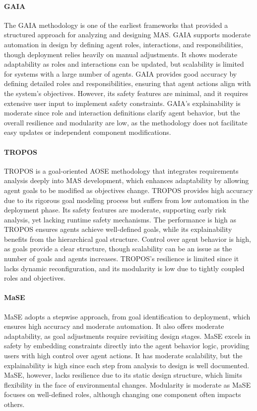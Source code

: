 \documentclass[sigconf,anonymous]{aamas}
\begin{document}
\paragraph{GAIA}
The GAIA methodology \cite{wooldridge1999method} is one of the earliest frameworks that provided a structured approach for analyzing and designing MAS. GAIA supports moderate automation in design by defining agent roles, interactions, and responsibilities, though deployment relies heavily on manual adjustments. It shows moderate adaptability as roles and interactions can be updated, but scalability is limited for systems with a large number of agents. GAIA provides good accuracy by defining detailed roles and responsibilities, ensuring that agent actions align with the system’s objectives. However, its safety features are minimal, and it requires extensive user input to implement safety constraints. GAIA’s explainability is moderate since role and interaction definitions clarify agent behavior, but the overall resilience and modularity are low, as the methodology does not facilitate easy updates or independent component modifications.

\paragraph{TROPOS}
TROPOS \cite{bresciani2004tropos} is a goal-oriented AOSE methodology that integrates requirements analysis deeply into MAS development, which enhances adaptability by allowing agent goals to be modified as objectives change. TROPOS provides high accuracy due to its rigorous goal modeling process but suffers from low automation in the deployment phase. Its safety features are moderate, supporting early risk analysis, yet lacking runtime safety mechanisms. The performance is high as TROPOS ensures agents achieve well-defined goals, while its explainability benefits from the hierarchical goal structure. Control over agent behavior is high, as goals provide a clear structure, though scalability can be an issue as the number of goals and agents increases. TROPOS’s resilience is limited since it lacks dynamic reconfiguration, and its modularity is low due to tightly coupled roles and objectives.

\paragraph{MaSE}
MaSE \cite{de1999multi} adopts a stepwise approach, from goal identification to deployment, which ensures high accuracy and moderate automation. It also offers moderate adaptability, as goal adjustments require revisiting design stages. MaSE excels in safety by embedding constraints directly into the agent behavior logic, providing users with high control over agent actions. It has moderate scalability, but the explainability is high since each step from analysis to design is well documented. MaSE, however, lacks resilience due to its static design structure, which limits flexibility in the face of environmental changes. Modularity is moderate as MaSE focuses on well-defined roles, although changing one component often impacts others.
\end{document}
